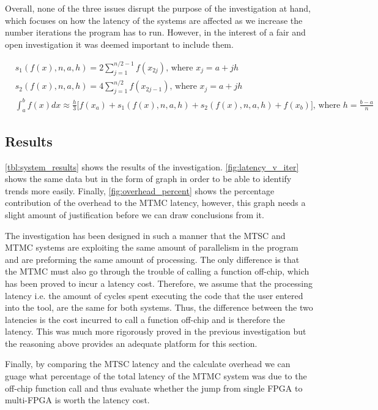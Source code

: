 Overall, none of the three issues disrupt the purpose of the investigation at hand, which focuses on how the latency of the systems are affected as we increase the number iterations the program has to run. However, in the interest of a fair and open investigation it was deemed important to include them.

\begin{align}
    & s_1(f(x),n,a,h) = 2 \sum_{j=1}^{n/2-1}f(x_{2j}) \text{, where } x_j = a + jh \\
    & s_2(f(x),n,a,h) = 4 \sum_{j=1}^{n/2}f(x_{2j-1}) \text{, where } x_j = a + jh \\
    &\int_{a}^{b} f(x) dx \approx \frac{h}{3} \Big[ f(x_a) + s_1(f(x),n,a,h) + s_2(f(x),n,a,h) + f(x_b) \Big] \text{, where } h = \frac{b-a}{n}  \label{eqn:comp_simp}
\end{align}

\subsection{Results}

\autoref{tbl:system_results} shows the results of the investigation. \autoref{fig:latency_v_iter} shows the same data but in the form of graph in order to be able to identify trends more easily.
Finally, \autoref{fig:overhead_percent} shows the percentage contribution of the overhead to the MTMC latency, however, this graph needs a slight amount of justification before we can draw conclusions from it.

The investigation has been designed in such a manner that the MTSC and MTMC systems are exploiting the same amount of parallelism in the program and are preforming the same amount of processing. The only difference is that the MTMC must also go through the trouble of calling a function off-chip, which has been proved to incur a latency cost. Therefore, we assume that the processing latency i.e. the amount of cycles spent executing the code that the user entered into the tool, are the same for both systems. Thus, the difference between the two latencies is the cost incurred to call a function off-chip and is therefore the latency. This was much more rigorously proved in the previous investigation but the reasoning above provides an adequate platform for this section.

Finally, by comparing the MTSC latency and the calculate overhead we can guage what percentage of the total latency of the MTMC system was due to the off-chip function call and thus evaluate whether the jump from single FPGA to multi-FPGA is worth the latency cost. 

